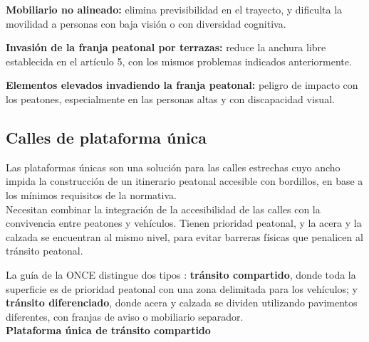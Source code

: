 \begin{inconvenientes}
  \item \textbf{Mobiliario no alineado:} elimina previsibilidad en el trayecto, y dificulta la movilidad a personas con baja visión o con diversidad cognitiva.
  \item \textbf{Invasión de la franja peatonal por terrazas:} reduce la anchura libre establecida en el artículo 5, con los mismos problemas indicados anteriormente. 
  \item \textbf{Elementos elevados invadiendo la franja peatonal:} peligro de impacto con los peatones, especialmente en las personas altas y con discapacidad visual.
\end{inconvenientes}

        {}

\parametroclave{\porrellenar}

\subsection{Calles de plataforma única}
\label{subsec:plataforma}

Las plataformas únicas son una solución para las calles estrechas cuyo ancho impida la construcción de un itinerario peatonal accesible con bordillos, en base a los mínimos requisitos de la normativa.
\\
Necesitan combinar la integración de la accesibilidad de las calles con la convivencia entre peatones y vehículos. Tienen prioridad peatonal, y la acera y la calzada se encuentran al mismo nivel, para evitar barreras físicas que penalicen al tránsito peatonal.

La guía de la ONCE distingue dos tipos \cite{once_2024}: \textbf{tránsito compartido}, donde toda la superficie es de prioridad peatonal con una zona delimitada para los vehículos; y \textbf{tránsito diferenciado}, donde acera y calzada se dividen utilizando pavimentos diferentes, con franjas de aviso o mobiliario separador.
\\


\textbf{Plataforma única de tránsito compartido}

